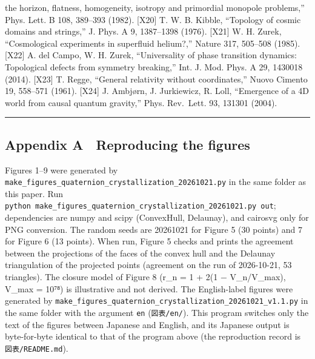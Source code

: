 \documentclass[
  a4paper,
]{article}
\begin{document}
the horizon, flatness, homogeneity, isotropy and primordial monopole
problems,'' Phys. Lett. B 108, 389--393 (1982). {[}X20{]} T. W. B.
Kibble, ``Topology of cosmic domains and strings,'' J. Phys. A 9,
1387--1398 (1976). {[}X21{]} W. H. Zurek, ``Cosmological experiments in
superfluid helium?,'' Nature 317, 505--508 (1985). {[}X22{]} A. del
Campo, W. H. Zurek, ``Universality of phase transition dynamics:
Topological defects from symmetry breaking,'' Int. J. Mod. Phys. A 29,
1430018 (2014). {[}X23{]} T. Regge, ``General relativity without
coordinates,'' Nuovo Cimento 19, 558--571 (1961). {[}X24{]} J. Ambjørn,
J. Jurkiewicz, R. Loll, ``Emergence of a 4D world from causal quantum
gravity,'' Phys. Rev.~Lett. 93, 131301 (2004).

\begin{center}\rule{0.5\linewidth}{0.5pt}\end{center}

\subsection{Appendix A　Reproducing the
figures}\label{appendix-a-reproducing-the-figures}

Figures 1--9 were generated by
\texttt{make\_\allowbreak{}figures\_\allowbreak{}quaternion\_\allowbreak{}crystallization\_\allowbreak{}20261021.py} in the
same folder as this paper. Run
\texttt{python\ make\_\allowbreak{}figures\_\allowbreak{}quaternion\_\allowbreak{}crystallization\_\allowbreak{}20261021.py\ out};
dependencies are numpy and scipy (ConvexHull, Delaunay), and cairosvg
only for PNG conversion. The random seeds are 20261021 for Figure 5 (30
points) and 7 for Figure 6 (13 points). When run, Figure 5 checks and
prints the agreement between the projections of the faces of the convex
hull and the Delaunay triangulation of the projected points (agreement
on the run of 2026-10-21, 53 triangles). The closure model of Figure 8
(r\_n = 1 + 2(1 − V\_n/V\_max), V\_max = 10⁷⁸) is illustrative and not
derived. The English-label figures were generated by
\texttt{make\_\allowbreak{}figures\_\allowbreak{}quaternion\_\allowbreak{}crystallization\_\allowbreak{}20261021\_\allowbreak{}v1.1.py}
in the same folder with the argument \texttt{en} (\texttt{図表/\allowbreak{}en/\allowbreak{}}).
This program switches only the text of the figures between Japanese and
English, and its Japanese output is byte-for-byte identical to that of
the program above (the reproduction record is \texttt{図表/\allowbreak{}README.md}).
\end{document}
